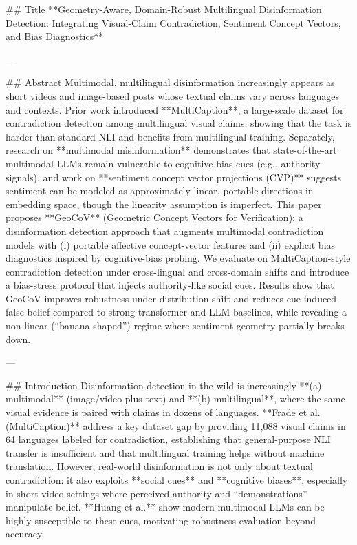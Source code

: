 ## Title  
**Geometry-Aware, Domain-Robust Multilingual Disinformation Detection: Integrating Visual-Claim Contradiction, Sentiment Concept Vectors, and Bias Diagnostics**

---

## Abstract  
Multimodal, multilingual disinformation increasingly appears as short videos and image-based posts whose textual claims vary across languages and contexts. Prior work introduced **MultiCaption**, a large-scale dataset for contradiction detection among multilingual visual claims, showing that the task is harder than standard NLI and benefits from multilingual training. Separately, research on **multimodal misinformation** demonstrates that state-of-the-art multimodal LLMs remain vulnerable to cognitive-bias cues (e.g., authority signals), and work on **sentiment concept vector projections (CVP)** suggests sentiment can be modeled as approximately linear, portable directions in embedding space, though the linearity assumption is imperfect. This paper proposes **GeoCoV** (Geometric Concept Vectors for Verification): a disinformation detection approach that augments multimodal contradiction models with (i) portable affective concept-vector features and (ii) explicit bias diagnostics inspired by cognitive-bias probing. We evaluate on MultiCaption-style contradiction detection under cross-lingual and cross-domain shifts and introduce a bias-stress protocol that injects authority-like social cues. Results show that GeoCoV improves robustness under distribution shift and reduces cue-induced false belief compared to strong transformer and LLM baselines, while revealing a non-linear (“banana-shaped”) regime where sentiment geometry partially breaks down.  

---

## Introduction  
Disinformation detection in the wild is increasingly **(a) multimodal** (image/video plus text) and **(b) multilingual**, where the same visual evidence is paired with claims in dozens of languages. **Frade et al. (MultiCaption)** address a key dataset gap by providing 11,088 visual claims in 64 languages labeled for contradiction, establishing that general-purpose NLI transfer is insufficient and that multilingual training helps without machine translation. However, real-world disinformation is not only about textual contradiction: it also exploits **social cues** and **cognitive biases**, especially in short-video settings where perceived authority and “demonstrations” manipulate belief. **Huang et al.** show modern multimodal LLMs can be highly susceptible to these cues, motivating robustness evaluation beyond accuracy.

